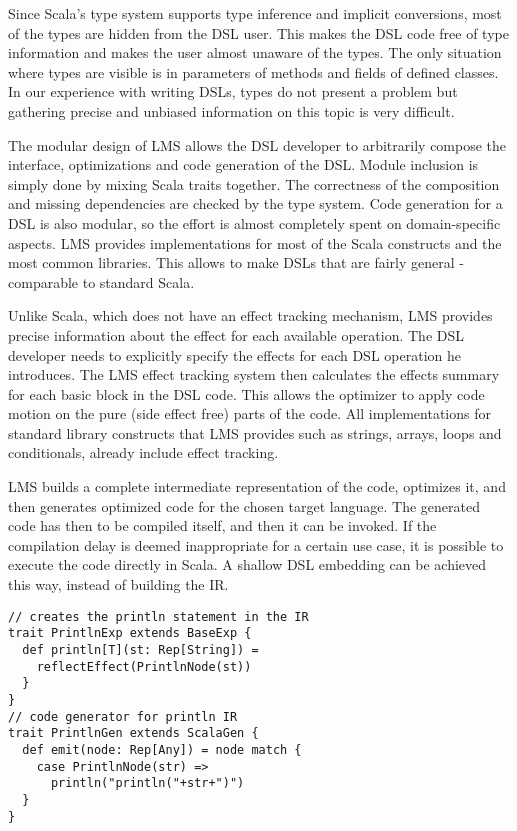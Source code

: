 Since Scala's type system supports type inference and implicit conversions, most
of the  types are hidden from the DSL user. This makes the DSL code
free of type information and makes the user almost unaware of the 
types. The only situation where  types are visible is in
parameters of methods and fields of defined classes. In our experience
with writing DSLs,  types do not present a problem but gathering
precise and unbiased information on this topic is very difficult.

The modular design of LMS allows the DSL developer to arbitrarily compose the
interface, optimizations and code generation of the DSL. Module inclusion is
simply done by mixing Scala traits together. The correctness of the composition
and missing dependencies are checked by the type system. Code generation for a
DSL is also modular, so the effort is almost completely spent on domain-specific
aspects. LMS provides implementations for most of the Scala constructs and the
most common libraries. This allows to make DSLs that are fairly general -
comparable to standard Scala.

Unlike Scala, which does not have an effect tracking mechanism, LMS provides
precise information about the effect for each available operation. The DSL
developer needs to explicitly specify the effects for each DSL operation he
introduces. The LMS effect tracking system then calculates the effects summary
for each basic block in the DSL code. This allows the optimizer to apply code
motion on the pure (side effect free) parts of the code. All implementations for
standard library constructs that LMS provides such as strings, arrays, loops and
conditionals, already include effect tracking.

LMS builds a complete intermediate representation of the code, optimizes it, and
then generates optimized code for the chosen target language. The generated code
has then to be compiled itself, and then it can be invoked. If the compilation
delay is deemed inappropriate for a certain use case, it is possible to execute
the code directly in Scala. A shallow DSL embedding can be achieved this way,
instead of building the IR.

\begin{lstlisting}[name=code, caption=Example of the DSL module used for
printing strings.
,captionpos=b, label=lst:println_dsl, float=t] 
// creates the println statement in the IR 
trait PrintlnExp extends BaseExp {
  def println[T](st: Rep[String]) =
    reflectEffect(PrintlnNode(st)) 
  }
}
// code generator for println IR
trait PrintlnGen extends ScalaGen {
  def emit(node: Rep[Any]) = node match {
    case PrintlnNode(str) =>
      println("println("+str+")")
  }
}
\end{lstlisting}

